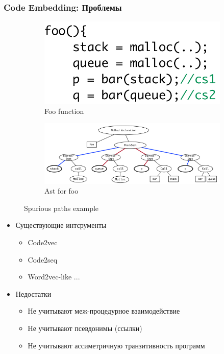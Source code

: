 \documentclass[xcolor=table,english]{beamer}
\begin{document}
\begin{frame}[fragile] \frametitle{Code Embedding: Проблемы}
    \begin{minipage}[m]{\linewidth}
        \begin{figure}
            \centering
            \begin{subfigure}[b]{0.35\textwidth}
                \includegraphics[width=\textwidth]{figures/code_for_ast.png}
                \caption{Foo function}
            \end{subfigure}
            \hfill
            \begin{subfigure}[b]{0.55\textwidth}
                \includegraphics[width=\textwidth]{figures/ast_approach.png}
                \caption{Ast for foo}
            \end{subfigure}
            \caption{Spurious paths example}
        \end{figure}
    \end{minipage}\hfill
    \begin{minipage}[m]{\linewidth}
        \begin{itemize}
        \item Существующие интсрументы
        {
        \begin{itemize}
            \item Code2vec
            \item Code2seq
            \item Word2vec-like ...
        \end{itemize}
        }
        \item Недостатки
        {
        \begin{itemize}
            \item Не учитывают меж-процедурное взаимодействие
            \item Не учитывают псевдонимы (ссылки)
            \item Не учитывают ассиметричную транзитивность программ
        \end{itemize}
        }
 \end{itemize}
    \end{minipage}
\end{frame}
\end{document}
